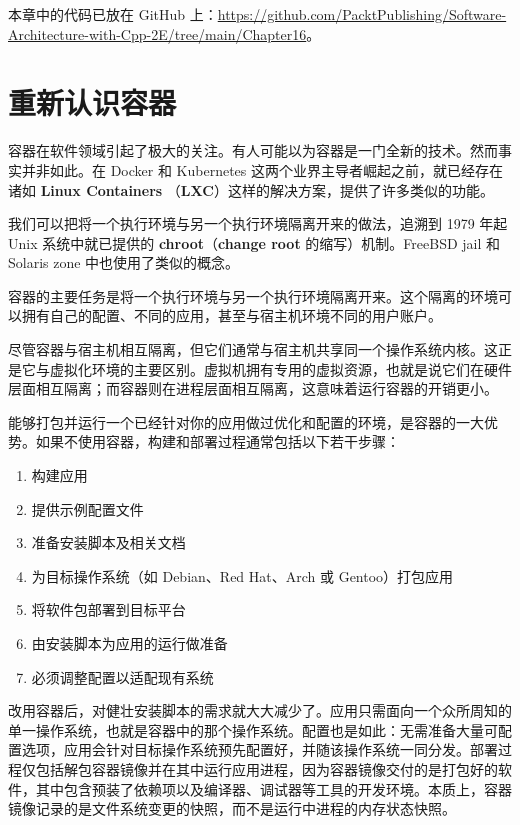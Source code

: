 本章中的代码已放在 GitHub 上：\href{https://github.com/PacktPublishing/Software-Architecture-with-Cpp-2E/tree/main/Chapter16}{https://github.com/PacktPublishing/Software-Architecture-with-Cpp-2E/tree/main/Chapter16}。

\section{重新认识容器}

\label{idx:1708}
\label{idx:1709}
容器在软件领域引起了极大的关注。有人可能以为容器是一门全新的技术。然而事实并非如此。在 Docker 和 Kubernetes 这两个业界主导者崛起之前，就已经存在诸如 \textbf{Linux Containers }（\textbf{LXC}）这样的解决方案，提供了许多类似的功能。

\label{idx:1710}
\label{idx:1711}
\label{idx:1712}
我们可以把将一个执行环境与另一个执行环境隔离开来的做法，追溯到 1979 年起 Unix 系统中就已提供的 \textbf{chroot}（\textbf{change root} 的缩写）机制。FreeBSD jail 和 Solaris zone 中也使用了类似的概念。

容器的主要任务是将一个执行环境与另一个执行环境隔离开来。这个隔离的环境可以拥有自己的配置、不同的应用，甚至与宿主机环境不同的用户账户。

尽管容器与宿主机相互隔离，但它们通常与宿主机共享同一个操作系统内核。这正是它与虚拟化环境的主要区别。虚拟机拥有专用的虚拟资源，也就是说它们在硬件层面相互隔离；而容器则在进程层面相互隔离，这意味着运行容器的开销更小。

能够打包并运行一个已经针对你的应用做过优化和配置的环境，是容器的一大优势。如果不使用容器，构建和部署过程通常包括以下若干步骤：

\begin{enumerate}
\item 构建应用
\item 提供示例配置文件
\item 准备安装脚本及相关文档
\item 为目标操作系统（如 Debian、Red Hat、Arch 或 Gentoo）打包应用
\item 将软件包部署到目标平台
\item 由安装脚本为应用的运行做准备
\item 必须调整配置以适配现有系统
\end{enumerate}

改用容器后，对健壮安装脚本的需求就大大减少了。应用只需面向一个众所周知的单一操作系统，也就是容器中的那个操作系统。配置也是如此：无需准备大量可配置选项，应用会针对目标操作系统预先配置好，并随该操作系统一同分发。部署过程仅包括解包容器镜像并在其中运行应用进程，因为容器镜像交付的是打包好的软件，其中包含预装了依赖项以及编译器、调试器等工具的开发环境。本质上，容器镜像记录的是文件系统变更的快照，而不是运行中进程的内存状态快照。

